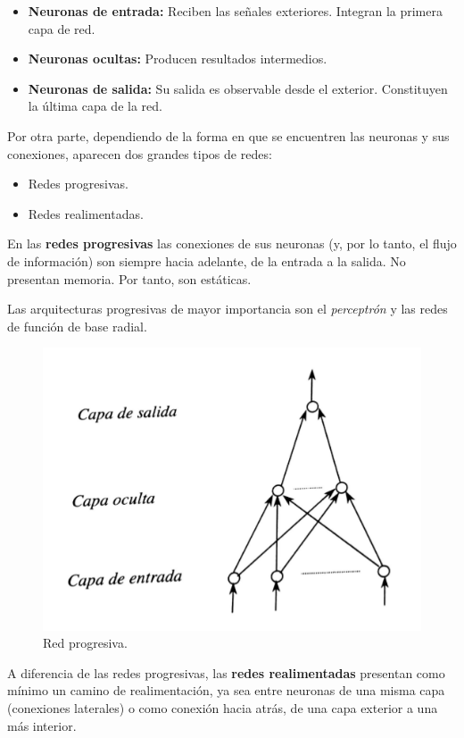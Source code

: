 		\begin{itemize}
			\item \textbf{Neuronas de entrada:} Reciben las señales exteriores. Integran la primera capa de red.
			\item \textbf{Neuronas ocultas:} Producen resultados intermedios.
			\item \textbf{Neuronas de salida:} Su salida es observable desde el exterior. Constituyen la última capa de la red.
		\end{itemize}

		Por otra parte, dependiendo de la forma en que se encuentren las neuronas y sus conexiones, aparecen dos grandes tipos de redes:
	
		\begin{itemize}
			\item Redes progresivas.
			\item Redes realimentadas.
		\end{itemize}

		En las \textbf{redes progresivas} las conexiones de sus neuronas (y, por lo tanto, el flujo de información) son siempre hacia adelante, de la entrada a la salida. No presentan memoria. Por tanto, son estáticas.

		Las arquitecturas progresivas de mayor importancia son el \textsl{perceptrón} y las redes de función de base radial.

		\begin{figure}[H]
			\centering
			\includegraphics[width=0.8\linewidth]{figures/redProgresiva}
			\caption{Red progresiva.}
			\label{fig:redProgresiva}
		\end{figure}	

		A diferencia de las redes progresivas, las \textbf{redes realimentadas} presentan como mínimo un camino de realimentación, ya sea entre neuronas de una misma capa (conexiones laterales) o como conexión hacia atrás, de una capa exterior a una más interior.

